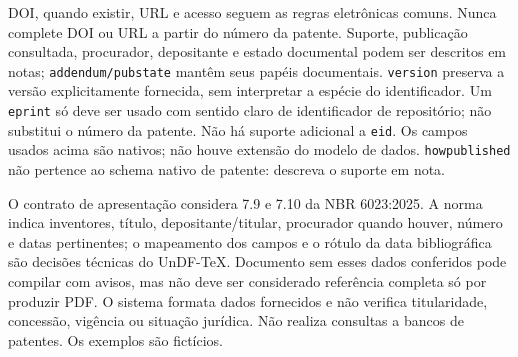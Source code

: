 DOI, quando existir, URL e acesso seguem as regras eletrônicas comuns.
Nunca complete DOI ou URL a partir do número da patente. Suporte, publicação
consultada, procurador, depositante e estado documental podem ser descritos
em notas; \texttt{addendum/pubstate} mantêm seus papéis documentais.
\texttt{version} preserva a versão explicitamente fornecida, sem interpretar
a espécie do identificador. Um \texttt{eprint} só deve ser usado com sentido
claro de identificador de repositório; não substitui o número da patente.
Não há suporte adicional a \texttt{eid}. Os campos usados acima são nativos;
não houve extensão do modelo de dados. \texttt{howpublished} não pertence ao
schema nativo de patente: descreva o suporte em nota.

O contrato de apresentação considera 7.9 e 7.10 da NBR 6023:2025. A norma
indica inventores, título, depositante/titular, procurador quando houver,
número e datas pertinentes; o mapeamento dos campos e o rótulo da data
bibliográfica são decisões técnicas do UnDF-TeX. Documento sem esses dados
conferidos pode compilar com avisos, mas não deve ser considerado referência
completa só por produzir PDF. O sistema formata dados fornecidos e não
verifica titularidade, concessão, vigência ou situação jurídica. Não realiza
consultas a bancos de patentes. Os exemplos são fictícios.
